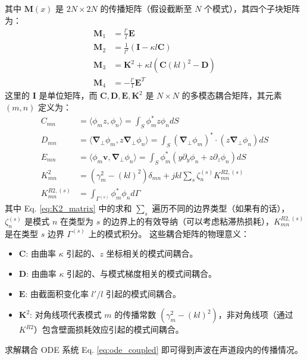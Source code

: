 \documentclass{ctexart}
\begin{document}
其中 $\mathbf{M}(x)$ 是 $2N \times 2N$ 的传播矩阵（假设截断至 $N$ 个模式），其四个子块矩阵为：
\begin{align}
\mathbf{M}_1 &= \frac{l'}{l} \mathbf{E} \label{eq:M1_def} \\
\mathbf{M}_2 &= \frac{1}{l^2} (\mathbf{I} - \kappa l \mathbf{C}) \label{eq:M2_def} \\
\mathbf{M}_3 &= \mathbf{K}^2 + \kappa l (\mathbf{C} (kl)^2 - \mathbf{D}) \label{eq:M3_def} \\
\mathbf{M}_4 &= -\frac{l'}{l} \mathbf{E}^T \label{eq:M4_def}
\end{align}
这里的 $\mathbf{I}$ 是单位矩阵，而 $\mathbf{C}, \mathbf{D}, \mathbf{E}, \mathbf{K}^2$ 是 $N \times N$ 的多模态耦合矩阵，其元素 $(m, n)$ 定义为：
\begin{align}
C_{mn} &= \langle \phi_m z, \phi_n \rangle = \int_S \phi_m^* z \phi_n dS \label{eq:C_matrix} \\
D_{mn} &= \langle \boldsymbol{\nabla}_\perp \phi_m, z \boldsymbol{\nabla}_\perp \phi_n \rangle = \int_S (\boldsymbol{\nabla}_\perp \phi_m)^* \cdot (z \boldsymbol{\nabla}_\perp \phi_n) dS \label{eq:D_matrix} \\
E_{mn} &= \langle \phi_m \mathbf{v}, \boldsymbol{\nabla}_\perp \phi_n \rangle = \int_S \phi_m^* (y \partial_y \phi_n + z \partial_z \phi_n) dS \label{eq:E_matrix} \\
K^2_{mn} &= (\gamma_m^2 - (kl)^2) \delta_{mn} + jkl \sum_s \zeta_n^{(s)} K^{R2, (s)}_{mn} \label{eq:K2_matrix} \\
K^{R2, (s)}_{mn} &= \int_{\Gamma^{(s)}} \phi_m^* \phi_n d\Gamma \label{eq:KR2_matrix}
\end{align}
其中 Eq. \eqref{eq:K2_matrix} 中的求和 $\sum_s$ 遍历不同的边界类型（如果有的话），$\zeta_n^{(s)}$ 是模式 $n$ 在类型为 $s$ 的边界上的有效导纳（可以考虑粘滞热损耗），$K^{R2, (s)}_{mn}$ 是在类型 $s$ 边界 $\Gamma^{(s)}$ 上的模式积分。
这些耦合矩阵的物理意义：
\begin{itemize}
    \item $\mathbf{C}$: 由曲率 $\kappa$ 引起的、$z$ 坐标相关的模式间耦合。
    \item $\mathbf{D}$: 由曲率 $\kappa$ 引起的、与模式梯度相关的模式间耦合。
    \item $\mathbf{E}$: 由截面积变化率 $l'/l$ 引起的模式间耦合。
    \item $\mathbf{K}^2$: 对角线项代表模式 $m$ 的传播常数 $(\gamma_m^2 - (kl)^2)$，非对角线项（通过 $K^{R2}$）包含壁面损耗效应引起的模式间耦合。
\end{itemize}
求解耦合 ODE 系统 Eq. \eqref{eq:ode_coupled} 即可得到声波在声道段内的传播情况。
\end{document}
